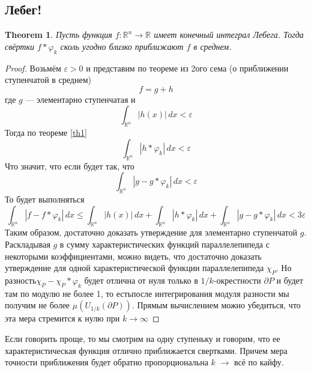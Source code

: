 \documentclass[a4paper,12pt]{article} %
\newtheorem{theorem}{Theorem}
\theoremstyle{definition}
\begin{document}
\subsection{Лебег!}
\begin{theorem}
	Пусть функция $f : \mathbb{R}^n \rightarrow \mathbb{R}$ имеет конечный интеграл Лебега. Тогда свёртки $f * \varphi_k$ сколь угодно близко приближают $f$ в среднем.
\end{theorem}
\begin{proof}
	Возьмём $\varepsilon > 0$ и представим по теореме из 2ого сема (о приближении ступенчатой в среднем)
	\begin{equation}
		f = g + h
	\end{equation}
	где $g$ --- элементарно ступенчатая и 
	\begin{equation}
		\int_{\mathbb{R}^n} |h(x)| \, dx < \varepsilon
	\end{equation}
	Тогда по теореме \ref{th1} 
	\begin{equation}
		\int_{\mathbb{R}^n} |h * \varphi_k| \, dx < \varepsilon
	\end{equation}
	Что значит, что если будет так, что 
	\begin{equation}
		\int_{\mathbb{R}^n} |g - g * \varphi_k| \, dx < \varepsilon
	\end{equation}
	То будет выполняться 
	\begin{equation}
		\int_{\mathbb{R}^n} |f - f * \varphi_k| \, dx \leq	\int_{\mathbb{R}^n} |h(x)| \, dx + \int_{\mathbb{R}^n} |h * \varphi_k| \, dx + \int_{\mathbb{R}^n} |g - g * \varphi_k| \, dx < 3 \varepsilon
	\end{equation}
	Таким образом, достаточно доказать утверждение для элементарно ступенчатой $g$. Раскладывая $g$ в сумму характеристических функций параллелепипеда с некоторыми коэффициентами, можно видеть, что достаточно доказать утверждение для одной характеристической функции параллелепипеда $\chi_P$. Но разность$\chi_P - \chi_P * \varphi_k$ будет отлична от нуля только в $1/k$-окрестности $\partial P$ и будет там по модулю не более 1, то естьпосле интегрирования модуля разности мы получим не более $\mu(U_{1/k}(\partial P))$. Прямым вычислением можно убедиться, что эта мера стремится к нулю при $k \rightarrow \infty$
\end{proof}
Если говорить проще, то мы смотрим на одну ступеньку и говорим, что ее характеристическая функция отлично приближается свертками. Причем мера точности приближения будет обратно пропорциональна $k$ $\rightarrow$ всё по кайфу.
\end{document}
